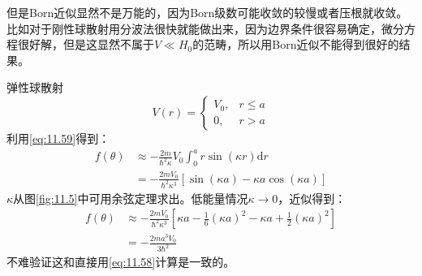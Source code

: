 \documentclass[a4paper,zihao=-4,linespread=1]{ctexrep}
\begin{document}
	但是Born近似显然不是万能的，因为Born级数可能收敛的较慢或者压根就收敛。比如对于刚性球散射用分波法很快就能做出来，因为边界条件很容易确定，微分方程很好解，但是这显然不属于$V\ll H_0$的范畴，所以用Born近似不能得到很好的结果。
	\begin{example}{弹性球散射}
		\begin{equation}
			V(r)=\begin{cases}
				V_0,&r\leq a\\
				0,&r>a
			\end{cases}
		\end{equation}
		利用\ref{eq:11.59}得到：
		\begin{equation}
			\begin{aligned}
				f(\theta)&\approx -\frac{2m}{\hbar^2\kappa}V_0\int_{0}^a r\sin(\kappa r)\mathrm{d}r\\
				&=-\frac{2mV_0}{\hbar^2\kappa^3}\left[\sin(\kappa a)-\kappa a\cos(\kappa a)\right]
			\end{aligned}
		\end{equation}
		$\kappa$从图\ref{fig:11.5}中可用余弦定理求出。低能量情况$\kappa\to 0$，近似得到：
		\begin{equation}
			\begin{aligned}
				f(\theta)&\approx -\frac{2mV_0}{\hbar^2\kappa^3}\left[\kappa a-\frac{1}{6}(\kappa a)^2-\kappa a+\frac{1}{2}(\kappa a)^2\right]\\
				&=-\frac{2ma^3V_0}{3\hbar^2}
			\end{aligned}
		\end{equation}
		不难验证这和直接用\ref{eq:11.58}计算是一致的。
	\end{example}
\end{document}
